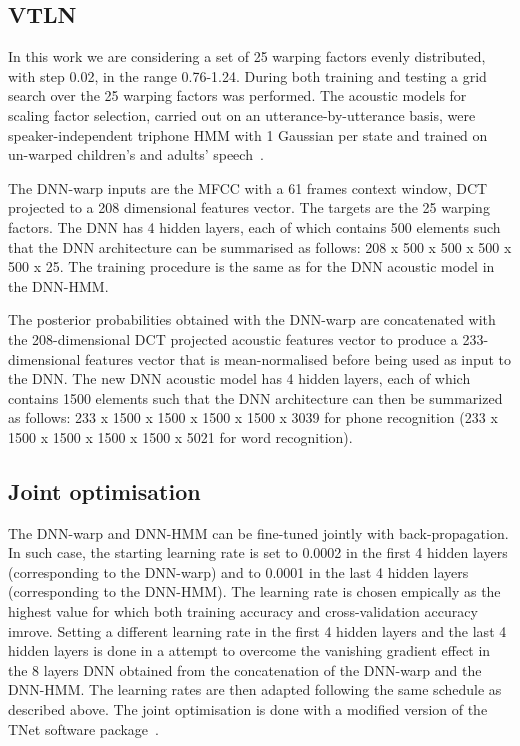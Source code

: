 \documentclass{nle}
\begin{document}
\subsection{VTLN}\label{sssection:exp:VTLN}
In  this  work  we are considering  a  set   of  25  warping   factors  evenly
distributed, with step 0.02, in the range 0.76-1.24. During both training and testing
a grid search over the 25 warping factors was performed.  The acoustic
models   for   scaling   factor    selection,   carried   out   on   an
utterance-by-utterance  basis, were speaker-independent  triphone HMM
with  1 Gaussian  per state  and  trained on  un-warped children's  and
adults' speech~\citep{WelKanNey99,GerGiuBru07}.

The DNN-warp inputs are the MFCC with a 61 frames context window, DCT
projected to a 208 dimensional features vector. The targets are the 25
warping factors. The  DNN has 4 hidden layers,  each of which contains
500  elements such  that the  DNN  architecture can  be summarised  as
follows: 208 x 500  x 500 x 500 x 500 x  25. The training procedure is
the same as for the DNN  acoustic model in the DNN-HMM.  

The posterior
probabilities  obtained with  the  DNN-warp are  concatenated with  the
208-dimensional DCT  projected acoustic  features vector to  produce a
233-dimensional features  vector that is mean-normalised  before being used
as input to  the DNN. The new DNN acoustic model  has 4 hidden layers,
each of  which contains 1500  elements such that the  DNN architecture
can then be summarized  as follows: 233 x 1500 x 1500  x 1500 x 1500 x
3039 for phone recognition (233 x 1500 x 1500  x 1500 x 1500 x 5021 for word recognition).

\subsection{Joint optimisation}\label{sssection:exp:joint}
The DNN-warp and DNN-HMM can be fine-tuned jointly with back-propagation. In such case, the starting learning rate is set to 0.0002 in the first 4 hidden layers (corresponding to the DNN-warp) and to 0.0001 in the last 4 hidden layers (corresponding to the DNN-HMM). The learning rate is chosen empically as the highest value for which both training accuracy and cross-validation accuracy imrove. Setting a different learning rate in the first 4 hidden layers and the last 4 hidden layers is done in a attempt to overcome the vanishing gradient effect in the 8 layers DNN obtained from the concatenation of the DNN-warp and the DNN-HMM. The learning rates are then adapted following the same schedule as described above. The joint optimisation is done with a modified version of the TNet software package~\citep{vesely10}.
\end{document}
